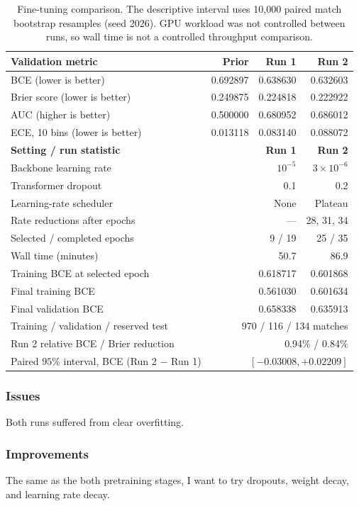 \documentclass[11pt]{article}
\begin{document}
    \begin{table}[H]
    \centering
    \small
    \renewcommand{\arraystretch}{1.15}
    \begin{tabularx}{\textwidth}{>{\raggedright\arraybackslash}X r r r}
    \toprule
    \textbf{Validation metric} & \textbf{Prior} & \textbf{Run 1} & \textbf{Run 2} \\
    \midrule
    BCE (lower is better) & 0.692897 & 0.638630 & 0.632603 \\
    Brier score (lower is better) & 0.249875 & 0.224818 & 0.222922 \\
    AUC (higher is better) & 0.500000 & 0.680952 & 0.686012 \\
    ECE, 10 bins (lower is better) & 0.013118 & 0.083140 & 0.088072 \\
    \midrule
    \textbf{Setting / run statistic} & & \textbf{Run 1} & \textbf{Run 2} \\
    Backbone learning rate & & $10^{-5}$ & $3\times10^{-6}$ \\
    Transformer dropout & & 0.1 & 0.2 \\
    Learning-rate scheduler & & None & Plateau \\
    Rate reductions after epochs & & --- & 28, 31, 34 \\
    Selected / completed epochs & & 9 / 19 & 25 / 35 \\
    Wall time (minutes) & & 50.7 & 86.9 \\
    Training BCE at selected epoch & & 0.618717 & 0.601868 \\
    Final training BCE & & 0.561030 & 0.601634 \\
    Final validation BCE & & 0.658338 & 0.635913 \\
    \midrule
    Training / validation / reserved test & \multicolumn{3}{r}{970 / 116 / 134 matches} \\
    Run 2 relative BCE / Brier reduction & \multicolumn{3}{r}{0.94\% / 0.84\%} \\
    Paired $95\%$ interval, BCE (Run 2 $-$ Run 1) & \multicolumn{3}{r}{$[-0.03008,+0.02209]$} \\
    \bottomrule
    \end{tabularx}
    \caption{Fine-tuning comparison. The descriptive interval uses 10,000 paired
    match bootstrap resamples (seed 2026). GPU workload was not controlled
    between runs, so wall time is not a controlled throughput comparison.}
    \label{tab:finetune-results}
    \end{table}

\subsubsection{Issues}
    Both runs suffered from clear overfitting. 

\subsubsection{Improvements}
    The same as the both pretraining stages, I want to try dropouts, weight decay, and learning rate decay. 
\end{document}
